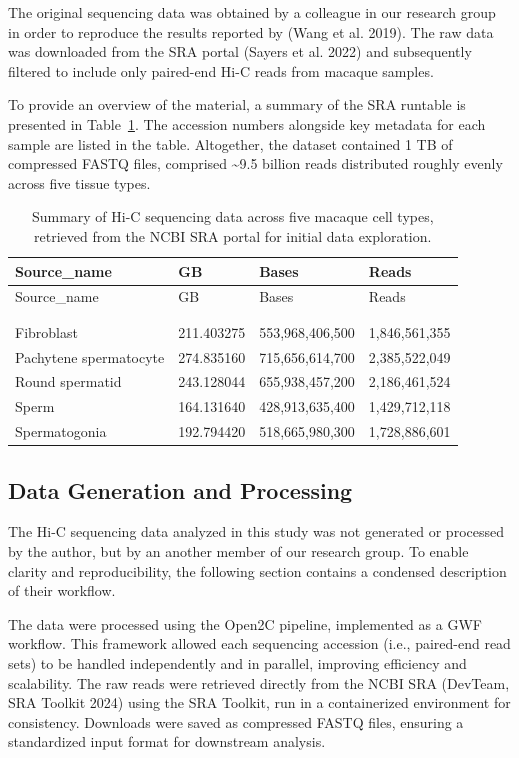 \documentclass[
  a4paper,
  openany]{scrbook}
\begin{document}
The original sequencing data was obtained by a colleague in our research
group in order to reproduce the results reported by (Wang et al. 2019).
The raw data was downloaded from the SRA portal (Sayers et al. 2022) and
subsequently filtered to include only paired-end Hi-C reads from macaque
samples.

To provide an overview of the material, a summary of the SRA runtable is
presented in Table~\ref{tbl-cell-data}. The accession numbers alongside
key metadata for each sample are listed in the table. Altogether, the
dataset contained 1 TB of compressed FASTQ files, comprised
\textasciitilde9.5 billion reads distributed roughly evenly across five
tissue types.

\begin{longtable}[]{@{}llll@{}}
\toprule\noalign{}
Source\_name & GB & Bases & Reads \\
\midrule\noalign{}
\endfirsthead
\toprule\noalign{}
Source\_name & GB & Bases & Reads \\
\midrule\noalign{}
\endhead
\bottomrule\noalign{}
\tabularnewline
\caption{Summary of Hi-C sequencing data across five macaque cell types,
retrieved from the NCBI SRA portal for initial data
exploration.}\label{tbl-cell-data}\tabularnewline
\endlastfoot
Fibroblast & 211.403275 & 553,968,406,500 & 1,846,561,355 \\
Pachytene spermatocyte & 274.835160 & 715,656,614,700 & 2,385,522,049 \\
Round spermatid & 243.128044 & 655,938,457,200 & 2,186,461,524 \\
Sperm & 164.131640 & 428,913,635,400 & 1,429,712,118 \\
Spermatogonia & 192.794420 & 518,665,980,300 & 1,728,886,601 \\
\end{longtable}

\subsection{Data Generation and
Processing}\label{data-generation-and-processing}

The Hi-C sequencing data analyzed in this study was not generated or
processed by the author, but by an another member of our research group.
To enable clarity and reproducibility, the following section contains a
condensed description of their workflow.

The data were processed using the Open2C pipeline, implemented as a GWF
workflow. This framework allowed each sequencing accession (i.e.,
paired-end read sets) to be handled independently and in parallel,
improving efficiency and scalability. The raw reads were retrieved
directly from the NCBI SRA (DevTeam, SRA Toolkit 2024) using the SRA
Toolkit, run in a containerized environment for consistency. Downloads
were saved as compressed FASTQ files, ensuring a standardized input
format for downstream analysis.
\end{document}
